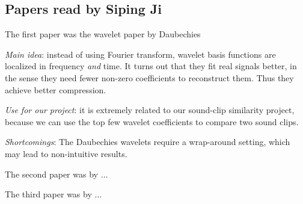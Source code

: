 \subsection{Papers read by Siping Ji}
The first paper was the wavelet paper by Daubechies
\cite{Daubechies92Ten}
\begin{itemize*}
\item {\em Main idea}: instead of using Fourier transform,
      wavelet basis functions are localized in frequency {\em and} time.
      It turns out that they fit real signals better,
      in the sense they need fewer non-zero coefficients to reconstruct
      them. Thus they achieve better compression.
\item {\em Use for our project}:
      it is extremely related to our sound-clip similarity
      project, because we can use the top few wavelet coefficients
      to compare two sound clips.
\item {\em Shortcomings}:
      The Daubechies wavelets require a wrap-around setting,
      which may lead to non-intuitive results.
\end{itemize*}
The second paper was by $\ldots$

The third paper was by $\ldots$